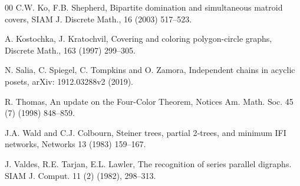 \documentclass{article}
\begin{document}
\begin{thebibliography}{00}
 C.W. Ko, F.B. Shepherd, Bipartite domination and simultaneous matroid covers, SIAM J. Discrete Math., 16 (2003) 517--523.

 A. Kostochka, J. Kratochvil, Covering and coloring polygon-circle graphs, Discrete Math., 163 (1997) 299--305.

 N. Salia, C. Spiegel, C. Tompkins and O. Zamora, Independent chains in acyclic posets, arXiv: 1912.03288v2 (2019). 

 R. Thomas, An update on the Four-Color Theorem, Notices Am. Math. Soc. 45 (7) (1998) 848–859.

 J.A. Wald and C.J. Colbourn, Steiner trees, partial 2‐trees, and minimum IFI networks, Networks 13 (1983) 159–167.

 J. Valdes, R.E. Tarjan, E.L. Lawler, The recognition of series parallel digraphs. SIAM J. Comput. 11 (2) (1982), 298--313.

\end{thebibliography}
\end{document}
